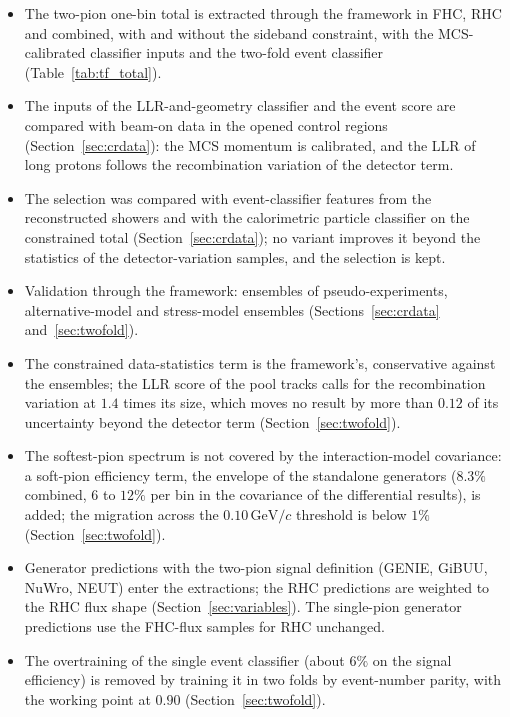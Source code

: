 \documentclass[11pt,a4paper]{article}
\newcommand{\GeVc}{\,\text{GeV}\!/c}
\begin{document}
\begin{itemize}[nosep]
  \item The two-pion one-bin total is extracted through the framework in FHC, RHC and combined, with
        and without the sideband constraint, with the MCS-calibrated classifier inputs and the two-fold event
        classifier (Table~\ref{tab:tf_total}).
  \item The inputs of the LLR-and-geometry classifier and the event score are compared with beam-on data
        in the opened control regions (Section~\ref{sec:crdata}): the MCS momentum is calibrated, and the
        LLR of long protons follows the recombination variation of the detector term.
  \item The selection was compared with event-classifier features from the reconstructed showers and with
        the calorimetric particle classifier on the constrained total (Section~\ref{sec:crdata}); no
        variant improves it beyond the statistics of the detector-variation samples, and the selection is
        kept.
  \item Validation through the framework: ensembles of pseudo-experiments, alternative-model and stress-model
        ensembles (Sections~\ref{sec:crdata} and~\ref{sec:twofold}).
  \item The constrained data-statistics term is the framework's, conservative against the ensembles; the LLR
        score of the pool tracks calls for the recombination variation at $1.4$ times its size, which moves no
        result by more than $0.12$ of its uncertainty beyond the detector term (Section~\ref{sec:twofold}).
  \item The softest-pion spectrum is not covered by the interaction-model covariance: a soft-pion efficiency term,
        the envelope of the standalone generators ($8.3\%$ combined, $6$ to $12\%$ per bin in the covariance of the
        differential results), is added; the migration across the $0.10\GeVc$
        threshold is below $1\%$ (Section~\ref{sec:twofold}).
  \item Generator predictions with the two-pion signal definition (GENIE, GiBUU, NuWro, NEUT) enter the extractions;
        the RHC predictions are weighted to the RHC flux shape (Section~\ref{sec:variables}). The single-pion
        generator predictions use the FHC-flux samples for RHC unchanged.
  \item The overtraining of the single event classifier (about $6\%$ on the signal efficiency) is removed by training it
        in two folds by event-number parity, with the working point at $0.90$ (Section~\ref{sec:twofold}).

\end{itemize}
\end{document}

